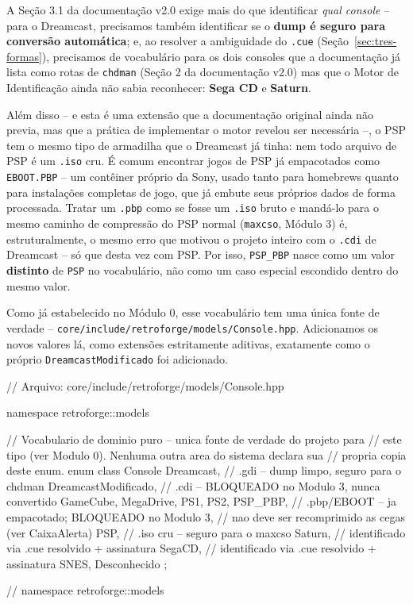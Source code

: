 A Seção 3.1 da documentação v2.0 exige mais do que identificar \textit{qual console} -- para o Dreamcast, precisamos também identificar se o \textbf{dump é seguro para conversão automática}; e, ao resolver a ambiguidade do \texttt{.cue} (Seção~\ref{sec:tres-formas}), precisamos de vocabulário para os dois consoles que a documentação já lista como rotas de \texttt{chdman} (Seção 2 da documentação v2.0) mas que o Motor de Identificação ainda não sabia reconhecer: \textbf{Sega CD} e \textbf{Saturn}.

Além disso -- e esta é uma extensão que a documentação original ainda não previa, mas que a prática de implementar o motor revelou ser necessária --, o PSP tem o mesmo tipo de armadilha que o Dreamcast já tinha: nem todo arquivo de PSP é um \texttt{.iso} cru. É comum encontrar jogos de PSP já empacotados como \texttt{EBOOT.PBP} -- um contêiner próprio da Sony, usado tanto para homebrews quanto para instalações completas de jogo, que já embute seus próprios dados de forma processada. Tratar um \texttt{.pbp} como se fosse um \texttt{.iso} bruto e mandá-lo para o mesmo caminho de compressão do PSP normal (\texttt{maxcso}, Módulo 3) é, estruturalmente, o mesmo erro que motivou o projeto inteiro com o \texttt{.cdi} de Dreamcast -- só que desta vez com PSP. Por isso, \texttt{PSP\_PBP} nasce como um valor \textbf{distinto} de \texttt{PSP} no vocabulário, não como um caso especial escondido dentro do mesmo valor.

Como já estabelecido no Módulo 0, esse vocabulário tem uma única fonte de verdade -- \texttt{core/include/retroforge/models/Console.hpp}. Adicionamos os novos valores lá, como extensões estritamente aditivas, exatamente como o próprio \texttt{DreamcastModificado} foi adicionado.

\begin{CaixaCodigo}
// Arquivo: core/include/retroforge/models/Console.hpp

namespace retroforge::models {

// Vocabulario de dominio puro -- unica fonte de verdade do projeto para
// este tipo (ver Modulo 0). Nenhuma outra area do sistema declara sua
// propria copia deste enum.
enum class Console {
    Dreamcast,           // .gdi -- dump limpo, seguro para o chdman
    DreamcastModificado, // .cdi -- BLOQUEADO no Modulo 3, nunca convertido
    GameCube,
    MegaDrive,
    PS1,
    PS2,
    PSP_PBP,             // .pbp/EBOOT -- ja empacotado; BLOQUEADO no Modulo 3,
                         // nao deve ser recomprimido as cegas (ver CaixaAlerta)
    PSP,                 // .iso cru -- seguro para o maxcso
    Saturn,              // identificado via .cue resolvido + assinatura
    SegaCD,              // identificado via .cue resolvido + assinatura
    SNES,
    Desconhecido
};

} // namespace retroforge::models
\end{CaixaCodigo}

